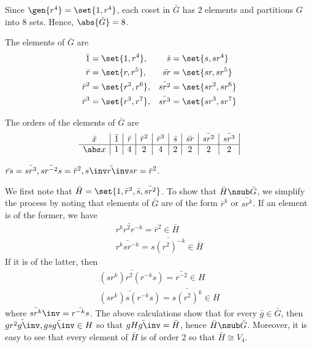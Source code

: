 \begin{solenum}
    \item Since $\gen{r^4} = \set{1, r^4}$, each coset in $\bar G$ has 2 elements and partitions $G$ into 8 sets.
	Hence, $\abs{\bar G} = 8$.
    \item The elements of $\bar G$ are
    \begin{align*}
        \bar 1 & = \set{1, r^4}, & \bar{s} & = \set{s, sr^4} \\
        \bar r & = \set{r, r^5}, & \bar{sr} & = \set{sr, sr^5} \\
        \bar r^2 & = \set{r^2, r^6}, & \bar{sr^2} & = \set{sr^2, sr^6} \\
        \bar r^3 & = \set{r^3, r^7}, & \bar{sr^3} & = \set{sr^3, sr^7}
    \end{align*}
    \item The orders of the elements of $\bar G$ are
    \[
        \begin{array}{*{9}{c|}}
            \bar x & \bar 1 & \bar r & \bar r^2 & \bar r^3 & \bar s & \bar{sr} & \bar{sr^2} & \bar{sr^3} \\
            \hline
            \abs x & 1 & 4 & 2 & 4 & 2 & 2 & 2 & 2
        \end{array}
    \]
    \item $\bar{rs} = \bar{sr^3}, \bar{sr^{-2}s} = \bar r^2, \bar{s\inv r\inv sr} = \bar r^2$.
    \item We first note that $\bar H = \set{1, \bar r^2, \bar s, \bar{sr^2}}$.
	To show that $\bar H \nsub \bar G$, we simplify the process by noting that elements of $\bar G$ are of the form $\bar r^k$ or $\bar{sr^k}$.
	If an element is of the former, we have
    \begin{align*}
        \bar{r^kr^2r^{-k}} = \bar r^2 \in \bar H \\
        \bar{r^ksr^{-k}} = \bar{s(r^2)^{-k}} \in \bar H
    \end{align*}
    If it is of the latter, then
    \begin{align*}
        \bar{(sr^k)r^2(r^{-k}s)} = \bar{r^{-2}} \in H \\
        \bar{(sr^k)s(r^{-k}s)} = \bar{s(r^2)^k} \in H
    \end{align*}
    where $\bar{sr^k}\inv = \bar{r^{-k}s}$.
	The above calculations show that for every $\bar g \in \bar G$, then $\bar{gr^2g\inv}, \bar{gsg\inv} \in H$ so that $\bar{gHg\inv} = \bar H$, hence $\bar H \nsub \bar G$.
	Moreover, it is easy to see that every element of $\bar H$ is of order 2 so that $\bar H \cong V_4$.


\end{solenum}
